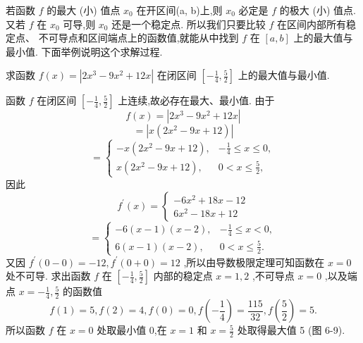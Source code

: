 若函数 \(f\) 的最大 (小) 值点 \({x}_{0}\) 在开区间(a, b)上,则 \({x}_{0}\) 必定是 \(f\) 的极大 (小) 值点. 又若 \(f\) 在 \({x}_{0}\) 可导,则 \({x}_{0}\) 还是一个稳定点. 所以我们只要比较 \(f\) 在区间内部所有稳定点、 不可导点和区间端点上的函数值,就能从中找到 \(f\) 在 \(\left\lbrack  {a,b}\right\rbrack\) 上的最大值与最小值. 下面举例说明这个求解过程.

\begin{example}
求函数 \(f\left( x\right)  = \left| {2{x}^{3} - 9{x}^{2} + {12x}}\right|\) 在闭区间 \(\left\lbrack  {-\frac{1}{4},\frac{5}{2}}\right\rbrack\) 上的最大值与最小值.
\end{example}


\begin{solution}
函数 \(f\) 在闭区间 \(\left\lbrack  {-\frac{1}{4},\frac{5}{2}}\right\rbrack\) 上连续,故必存在最大、最小值. 由于
\[
f\left( x\right)  = \left| {2{x}^{3} - 9{x}^{2} + {12x}}\right|
\]
\[
= \left| {x\left( {2{x}^{2} - {9x} + {12}}\right) }\right|
\]
\[
= \left\{  \begin{array}{ll}  - x\left( {2{x}^{2} - {9x} + {12}}\right) , &  - \frac{1}{4} \leq  x \leq  0, \\  x\left( {2{x}^{2} - {9x} + {12}}\right) , & 0 < x \leq  \frac{5}{2}, \end{array}\right.
\]
因此
\[
{f}^{\prime }\left( x\right)  = \left\{  \begin{array}{l}  - 6{x}^{2} + {18x} - {12} \\  6{x}^{2} - {18x} + {12} \end{array}\right.
\]
\[
= \left\{  \begin{array}{ll}  - 6\left( {x - 1}\right) \left( {x - 2}\right) , &  - \frac{1}{4} \leq  x < 0, \\  6\left( {x - 1}\right) \left( {x - 2}\right) , & 0 < x \leq  \frac{5}{2}. \end{array}\right.
\]
又因 \({f}^{\prime }\left( {0 - 0}\right)  =  - {12},{f}^{\prime }\left( {0 + 0}\right)  = {12}\) ,所以由导数极限定理可知函数在 \(x = 0\) 处不可导. 求出函数 \(f\) 在 \(\left\lbrack  {-\frac{1}{4},\frac{5}{2}}\right\rbrack\) 内部的稳定点 \(x = 1,2\) ,不可导点 \(x = 0\) ,以及端点 \(x =  - \frac{1}{4},\frac{5}{2}\) 的函数值
\[
f\left( 1\right)  = 5,f\left( 2\right)  = 4,f\left( 0\right)  = 0,f\left( {-\frac{1}{4}}\right)  = \frac{115}{32},f\left( \frac{5}{2}\right)  = 5.
\]
所以函数 \(f\) 在 \(x = 0\) 处取最小值 0,在 \(x = 1\) 和 \(x = \frac{5}{2}\) 处取得最大值 5 (图 6-9).
\end{solution}

